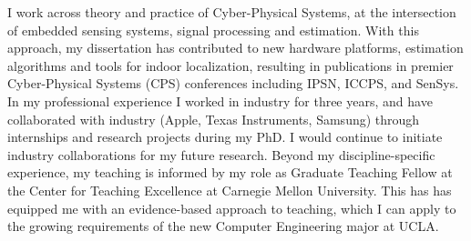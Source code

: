 \documentclass[10pt]{article}
\begin{document}


I work across theory and practice of Cyber-Physical Systems, at the intersection of embedded sensing systems, signal processing and estimation.  
With this approach, my dissertation has contributed to new hardware platforms, estimation algorithms and tools for indoor localization, resulting in publications in premier Cyber-Physical Systems (CPS) conferences including IPSN, ICCPS, and SenSys. %
In my professional experience I worked in industry for three years, and have collaborated with industry (Apple, Texas Instruments, Samsung) through internships and research projects during my PhD. I would continue to initiate industry collaborations for my future research. Beyond my discipline-specific experience, my teaching is informed by my role as Graduate Teaching Fellow at the Center for Teaching Excellence at Carnegie Mellon University. This has has equipped me with an evidence-based approach to teaching, which I can apply to the growing requirements of the new Computer Engineering major at UCLA. \\%
\end{document}
